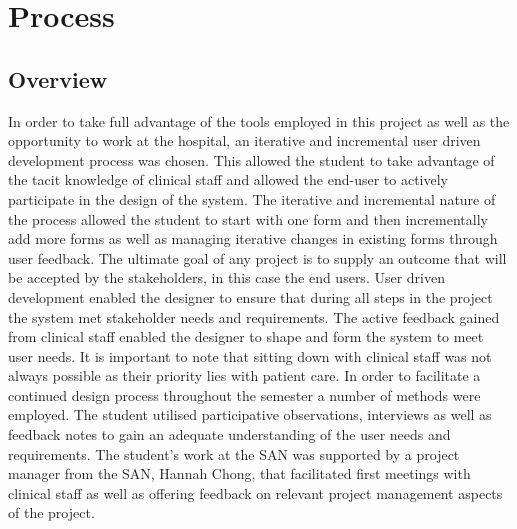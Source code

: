 \section{Process}
\subsection{Overview}
\label{Overview}
In order to take full advantage of the tools employed in this project as well as the opportunity to work at the hospital, an iterative and incremental user driven development process was chosen. This allowed the student to take advantage of the tacit knowledge of clinical staff and allowed the end-user to actively participate in the design of the system. The iterative and incremental nature of the process allowed the student to start with one form and then incrementally add more forms as well as managing iterative changes in existing forms through user feedback. The ultimate goal of any project is to supply an outcome that will be accepted by the stakeholders, in this case the end users. User driven development enabled the designer to ensure that during all steps in the project the system met stakeholder needs and requirements. The active feedback gained from clinical staff enabled the designer to shape and form the system to meet user needs. It is important to note that sitting down with clinical staff was not always possible as their priority lies with patient care. In order to facilitate a continued design process throughout the semester a number of methods were employed. The student utilised participative observations, interviews as well as feedback notes to gain an adequate understanding of the user needs and requirements. The student's work at the SAN was supported by a project manager from the SAN, Hannah Chong, that facilitated first meetings with clinical staff as well as offering feedback on relevant project management aspects of the project.

